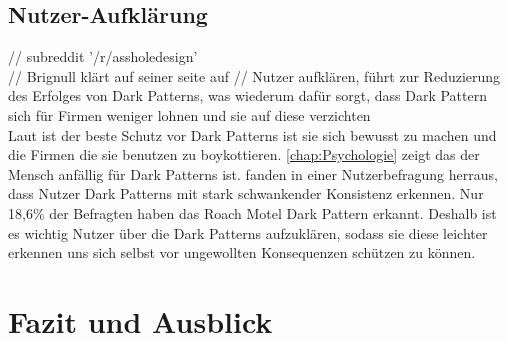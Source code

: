 \documentclass[conference,compsoc,final,a4paper]{IEEEtran}
\begin{document}
\subsection{Nutzer-Aufklärung}
// subreddit '/r/assholedesign' \autocite{Chivukula_2019}\\
// Brignull klärt auf seiner seite auf \autocite{Brignull}
// Nutzer aufklären, führt zur Reduzierung des Erfolges von Dark Patterns, was wiederum dafür sorgt, dass Dark Pattern sich für Firmen weniger lohnen und sie auf diese verzichten\\
Laut \citeauthor{Brignull} \autocite{Brignull} ist der beste Schutz vor Dark Patterns ist sie sich bewusst zu machen und die Firmen die sie benutzen zu boykottieren. \autoref{chap:Psychologie} zeigt das der Mensch anfällig für Dark Patterns ist. \citeauthor{M.Bhoot2020} \autocite{M.Bhoot2020} fanden in einer Nutzerbefragung herraus, dass Nutzer Dark Patterns mit stark schwankender Konsistenz erkennen. Nur 18,6\% der Befragten haben das Roach Motel Dark Pattern erkannt. Deshalb ist es wichtig Nutzer über die Dark Patterns aufzuklären, sodass sie diese leichter erkennen uns sich selbst vor ungewollten Konsequenzen schützen zu können.

\section{Fazit und Ausblick}

\nocite{*}
\printbibliography
\end{document}
